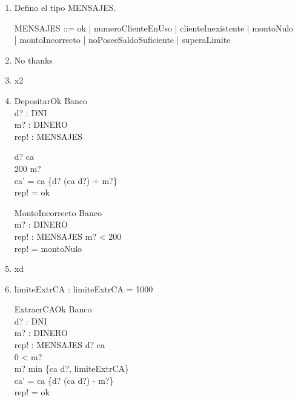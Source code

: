 \documentclass[11pt]{article}
\begin{document}
  \begin{enumerate}
    \item 
    Defino el tipo MENSAJES.
    \begin{zed}
      MENSAJES ::= ok | numeroClienteEnUso | clienteInexistente | montoNulo \\
                      | montoIncorrecto | noPoseeSaldoSuficiente | superaLimite
    \end{zed}
    \item No thanks
    \item x2
    \item
    \begin{schema}{DepositarOk}
      \Delta Banco \\
      d? : DNI \\
      m? : DINERO \\
      rep! : MENSAJES

      \where
      d? \in \dom ca \\
      200 \leq m? \\
      ca' = ca \oplus \{d? \mapsto (ca \; d?) + m?\} \\
      rep! = ok
    \end{schema}

    \begin{schema}{MontoIncorrecto}
      \Xi Banco \\
      m? : DINERO \\
      rep! : MENSAJES
      \where
      m? < 200 \\
      rep! = montoNulo
    \end{schema}
    \item xd
    \item 
    \begin{axdef}
      limiteExtrCA : \nat
      \where
      limiteExtrCA = 1000
    \end{axdef}

    \begin{schema}{ExtraerCAOk}
      \Delta Banco \\
      d? : DNI \\
      m? : DINERO \\
      rep! : MENSAJES 
      \where
      d? \in \dom ca \\
      0 < m?\\
      m? \leq min \{ca \; d?, \; limiteExtrCA\}\\
      ca' = ca \oplus \{d? \mapsto (ca \; d?) - m?\} \\
      rep! = ok
    \end{schema}
    

\end{enumerate}
\end{document}
